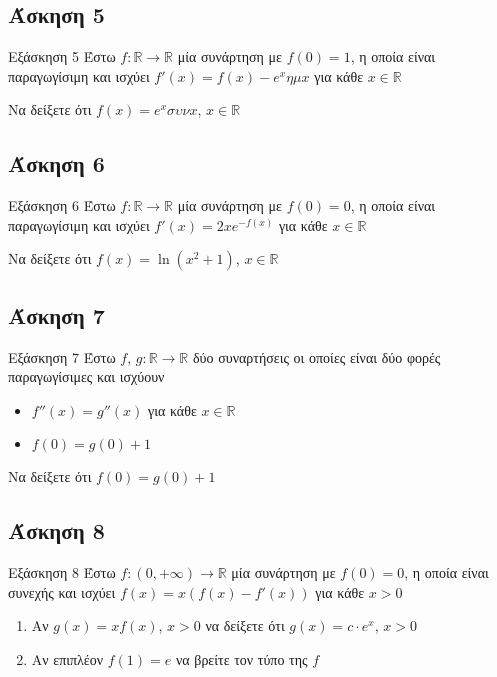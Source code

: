 \documentclass[greek]{beamer}
\begin{document}
\subsection{Άσκηση 5}
\begin{frame}[label=Άσκηση5]{Εξάσκηση 5}
 Έστω $f:\mathbb{R}\to\mathbb{R}$ μία συνάρτηση με $f(0)=1$, η οποία είναι παραγωγίσιμη και ισχύει $f'(x)=f(x)-e^xημx$ για κάθε $x\in\mathbb{R}$

 Να δείξετε ότι $f(x)=e^xσυνx$, $x\in\mathbb{R}$

\end{frame}

\subsection{Άσκηση 6}
\begin{frame}[label=Άσκηση6]{Εξάσκηση 6}
 Έστω $f:\mathbb{R}\to\mathbb{R}$ μία συνάρτηση με $f(0)=0$, η οποία είναι παραγωγίσιμη και ισχύει $f'(x)=2xe^{-f(x)}$ για κάθε $x\in\mathbb{R}$

 Να δείξετε ότι $f(x)=\ln (x^2+1)$, $x\in\mathbb{R}$

\end{frame}

\subsection{Άσκηση 7}
\begin{frame}[label=Άσκηση7]{Εξάσκηση 7}
 Έστω $f$, $g:\mathbb{R}\to\mathbb{R}$ δύο συναρτήσεις οι οποίες είναι δύο φορές παραγωγίσιμες και ισχύουν
 \begin{itemize}
  \item $f''(x)=g''(x)$ για κάθε $x\in\mathbb{R}$
  \item $f(0)=g(0)+1$
 \end{itemize}

 Να δείξετε ότι $f(0)=g(0)+1$

\end{frame}

\subsection{Άσκηση 8}
\begin{frame}[label=Άσκηση8]{Εξάσκηση 8}
 Έστω $f:(0,+\infty)\to\mathbb{R}$ μία συνάρτηση με $f(0)=0$, η οποία είναι συνεχής και ισχύει $f(x)=x(f(x)-f'(x))$ για κάθε $x>0$
 \begin{enumerate}
  \item<1-> Αν $g(x)=xf(x)$, $x>0$ να δείξετε ότι $g(x)=c\cdot e^x$, $x>0$
  \item<2-> Αν επιπλέον $f(1)=e$ να βρείτε τον τύπο της $f$
 \end{enumerate}

\end{frame}
\end{document}
